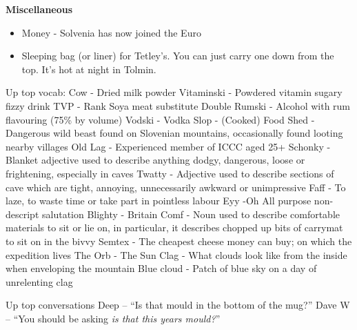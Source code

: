 \textbf{Miscellaneous}
\begin{itemize}
    \item Money - Solvenia has now joined the Euro
    \item Sleeping bag (or liner) for Tetley’s. You can just carry one down from the top. It's hot at night in Tolmin.
\end{itemize}

Up top vocab: 
Cow - Dried milk powder
Vitaminski -  Powdered vitamin sugary fizzy drink
TVP - Rank Soya meat substitute
Double Rumski  - Alcohol with rum flavouring (75\% by volume)
Vodski - Vodka
Slop - (Cooked) Food
Shed - Dangerous wild beast found on Slovenian mountains, occasionally found
looting nearby villages
Old Lag - Experienced member of ICCC aged 25+ 
Schonky - Blanket adjective used to describe anything dodgy, dangerous, loose or
frightening, especially in caves
Twatty - Adjective used to describe sections of cave which are tight, annoying,
unnecessarily awkward or unimpressive
Faff - To laze, to waste time or take part in pointless labour
Eyy -Oh All purpose non-descript salutation
Blighty - Britain
Comf - Noun used to describe comfortable materials to sit or lie on, in particular, it
describes chopped up bits of carrymat to sit on in the bivvy
Semtex - The cheapest cheese money can buy; on which the expedition lives
The Orb - The Sun
Clag - What clouds look like from the inside when enveloping the mountain
Blue cloud - Patch of blue sky on a day of unrelenting clag

Up top conversations
Deep – “Is that mould in the bottom of the mug?”
Dave W – “You should be asking \textit{is that this years mould?}”